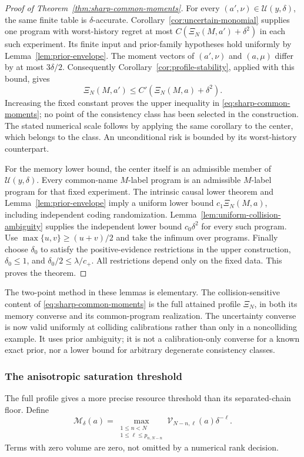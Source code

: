 \begin{proof}[Proof of Theorem~\ref{thm:sharp-common-moments}]
For every $(a',\nu)\in\mathcal U(y,\delta)$, the same finite table
is $\delta$-accurate. Corollary~\ref{cor:uncertain-monomial} supplies
one program with worst-history regret at most
$C(\Xi_N(M,a')+\delta^2)$ in each such experiment. Its finite input
and prior-family hypotheses hold uniformly by
Lemma~\ref{lem:prior-envelope}. The moment vectors of $(a',\nu)$
and $(a,\mu)$ differ by at most $3\delta/2$. Consequently
Corollary~\ref{cor:profile-stability}, applied with this bound, gives
\[
 \Xi_N(M,a')\le C'(\Xi_N(M,a)+\delta^2).
\]
Increasing the fixed constant proves the upper inequality in
\eqref{eq:sharp-common-moments}; no point of the consistency class has
been selected in the construction. The stated numerical scale follows
by applying the same corollary to the center, which belongs to the class.
An unconditional risk is bounded by its worst-history counterpart.

For the memory lower bound, the center itself is an admissible member
of $\mathcal U(y,\delta)$. Every common-name $M$-label program is an
admissible $M$-label program for that fixed experiment. The intrinsic
causal lower theorem and Lemma~\ref{lem:prior-envelope} imply a
uniform lower bound $c_1\Xi_N(M,a)$, including independent coding
randomization. Lemma~\ref{lem:uniform-collision-ambiguity} supplies
the independent lower bound $c_0\delta^2$ for every such program.
Use $\max\{u,v\}\ge(u+v)/2$ and take the infimum over programs.
Finally choose $\delta_0$ to satisfy the positive-evidence restrictions
in the upper construction, $\delta_0\le1$, and
$\delta_0/2\le\lambda/c_+$. All restrictions depend only on the fixed
data. This proves the theorem.
\end{proof}

The two-point method in these lemmas is elementary. The collision-sensitive
content of \eqref{eq:sharp-common-moments} is the full attained profile
$\Xi_N$, in both its memory converse and its common-program realization.
The uncertainty converse is now valid uniformly at colliding calibrations
rather than only in a noncolliding example. It uses prior ambiguity;
it is not a calibration-only converse for a known exact prior, nor a
lower bound for arbitrary degenerate consistency classes.

\subsubsection{The anisotropic saturation threshold}
The full profile gives a more precise resource threshold than its
separated-chain floor. Define
\begin{equation}\label{eq:advice-saturation-index}
 \mathcal M_\delta(a)=
 \max_{\substack{1\le n<N\\1\le\ell\le p_{n,N-n}}}
       \mathcal V_{N-n,\ell}(a)\delta^{-\ell}.
\end{equation}
Terms with zero volume are zero, not omitted by a numerical rank decision.

